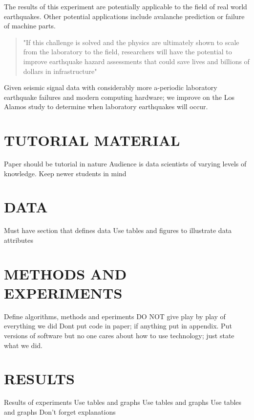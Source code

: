 \documentclass[]{llncs}
\begin{document}
The results of this experiment are potentially applicable to the field of real world earthquakes. Other potential applications include avalanche prediction or failure of machine parts.
\begin{quote}
	"If this challenge is solved and the physics are ultimately shown to scale from the laboratory to the field, researchers will have the potential to improve earthquake hazard assessments that could save lives and billions of dollars in infrastructure"\cite{kaggle}
\end{quote}

Given seismic signal data with considerably more a-periodic laboratory earthquake failures and modern computing hardware; we improve on the Los Alamos study\cite{Bertrand} to determine when laboratory earthquakes will occur.





\section{TUTORIAL MATERIAL}
Paper should be tutorial in nature
Audience is data scientists of varying levels of knowledge. Keep newer students in mind
\section{DATA}
Must have section that defines data
Use tables and figures to illustrate data attributes
\section{METHODS AND EXPERIMENTS}
Define algorithms, methods and eperiments
DO NOT give play by play of everything we did
Dont put code in paper; if anything put in appendix.
Put versions of software but no one cares about how to use technology; just state what we did.
\section{RESULTS}
Results of experiments
Use tables and graphs
Use tables and graphs
Use tables and graphs
Don't forget explanations
\end{document}

